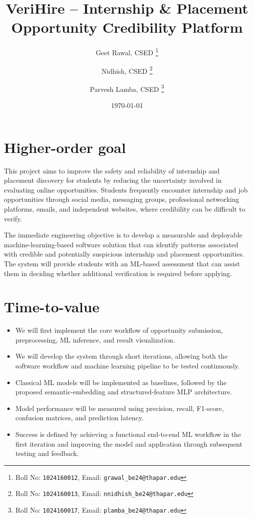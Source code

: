 \documentclass[11pt,a4paper]{article}
\title{VeriHire -- Internship \& Placement Opportunity Credibility Platform}
\author{
  Geet Rawal, CSED%
  \thanks{Roll No: \texttt{1024160012}, %
    Email: \texttt{grawal\_be24@thapar.edu}}
  \and
  Nidhish, CSED%
  \thanks{Roll No: \texttt{1024160013}, %
    Email: \texttt{nnidhish\_be24@thapar.edu}}
  \and
  Parvesh Lamba, CSED%
  \thanks{Roll No: \texttt{1024160017}, %
    Email: \texttt{plamba\_be24@thapar.edu}}
}
\date{\today}
\newcommand{\BvrHint}[1]{%
  {\normalfont\normalsize\itshape\hfill #1}}
\begin{document}
\maketitle

\section{Higher-order goal%
  \BvrHint{}}

This project aims to improve the safety and reliability of internship and
placement discovery for students by reducing the uncertainty involved in
evaluating online opportunities. Students frequently encounter internship
and job opportunities through social media, messaging groups, professional
networking platforms, emails, and independent websites, where credibility
can be difficult to verify.

The immediate engineering objective is to develop a measurable and deployable
machine-learning-based software solution that can identify patterns associated
with credible and potentially suspicious internship and placement opportunities.
The system will provide students with an ML-based assessment that can assist
them in deciding whether additional verification is required before applying.

\section{Time-to-value%
\BvrHint{}}

\begin{itemize}[leftmargin=0.7cm]
    \item We will first implement the core workflow of opportunity submission,
    preprocessing, ML inference, and result visualization.

    \item We will develop the system through short iterations, allowing both
    the software workflow and machine learning pipeline to be tested continuously.

    \item Classical ML models will be implemented as baselines, followed by
    the proposed semantic-embedding and structured-feature MLP architecture.

    \item Model performance will be measured using precision, recall, F1-score,
    confusion matrices, and prediction latency.

    \item Success is defined by achieving a functional end-to-end ML workflow
    in the first iteration and improving the model and application through
    subsequent testing and feedback.
\end{itemize}
\end{document}
